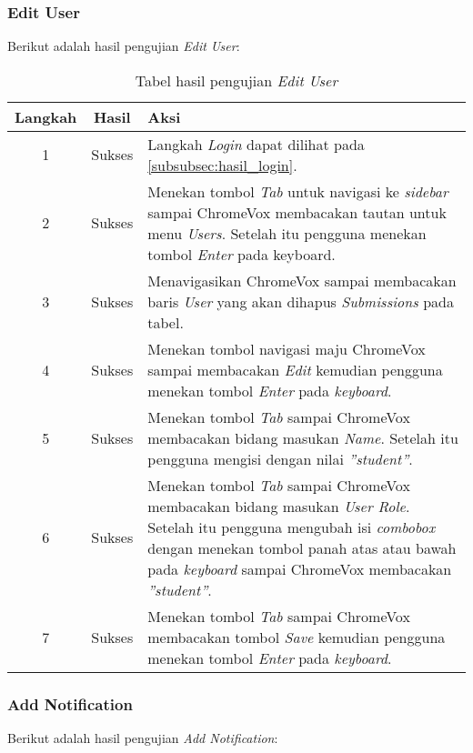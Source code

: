 \subsubsection{Edit User}
\label{subsubsec:hasil_edit_user}
Berikut adalah hasil pengujian \textit{Edit User}:

\begin{table}[H]
	\centering
	\caption{Tabel hasil pengujian \textit{Edit User}}
	\label{tab:hasil_edit_user}
	\begin{tabular}{|c|c|p{12cm}|}
		\toprule
		Langkah & Hasil & Aksi\\
		\midrule
		1 & Sukses & Langkah \textit{Login} dapat dilihat pada \ref{subsubsec:hasil_login}.\\
		2 & Sukses & Menekan tombol \textit{Tab} untuk navigasi ke \textit{sidebar} sampai ChromeVox membacakan tautan untuk menu \textit{Users}. Setelah itu pengguna menekan tombol \textit{Enter} pada keyboard.\\
		3 & Sukses & Menavigasikan ChromeVox sampai membacakan baris \textit{User} yang akan dihapus \textit{Submissions} pada tabel.\\
		4 & Sukses & Menekan tombol navigasi maju ChromeVox sampai membacakan \textit{Edit} kemudian pengguna menekan tombol \textit{Enter} pada \textit{keyboard}.\\
		5 & Sukses & Menekan tombol \textit{Tab} sampai ChromeVox membacakan bidang masukan \textit{Name}. Setelah itu pengguna mengisi dengan nilai \textit{''student''}.\\
		6 & Sukses & Menekan tombol \textit{Tab} sampai ChromeVox membacakan bidang masukan \textit{User Role}. Setelah itu pengguna mengubah isi \textit{combobox} dengan menekan tombol panah atas atau bawah pada \textit{keyboard} sampai ChromeVox membacakan \textit{''student''}.\\
		7 & Sukses & Menekan tombol \textit{Tab} sampai ChromeVox membacakan tombol \textit{Save} kemudian pengguna menekan tombol \textit{Enter} pada \textit{keyboard}.\\
		\bottomrule
	\end{tabular}
\end{table}

\subsubsection{Add Notification}
\label{subsubsec:hasil_add_notification}
Berikut adalah hasil pengujian \textit{Add Notification}:

